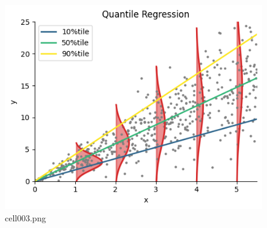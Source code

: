 \begin{figure}[ht]
	\centering
	\includegraphics[scale=0.8, max width=\linewidth]{./fig/bayesian-brain/quantile-expectile-regression/cell003.png}
	\caption{cell003.png}
	\label{cell003.png}
\end{figure}